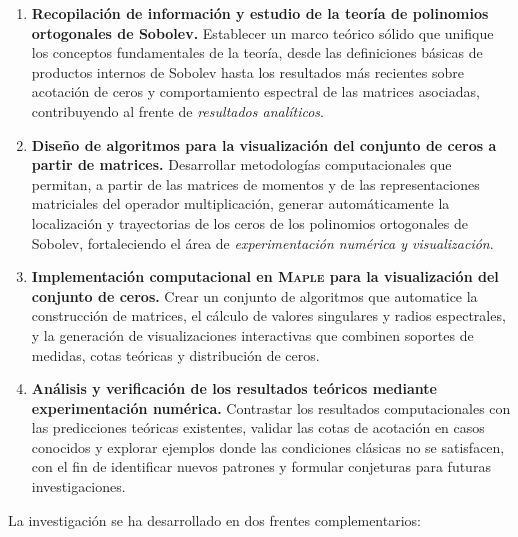 \begin{enumerate}
  \item \textbf{Recopilación de información y estudio de la teoría de polinomios ortogonales de Sobolev.}
        Establecer un marco teórico sólido que unifique los conceptos fundamentales de la teoría, desde las definiciones básicas de productos internos de Sobolev hasta los resultados más recientes sobre acotación de ceros y comportamiento espectral de las matrices asociadas, contribuyendo al frente de \emph{resultados analíticos}.

  \item \textbf{Diseño de algoritmos para la visualización del conjunto de ceros a partir de matrices.}
        Desarrollar metodologías computacionales que permitan, a partir de las matrices de momentos y de las representaciones matriciales del operador multiplicación, generar automáticamente la localización y trayectorias de los ceros de los polinomios ortogonales de Sobolev, fortaleciendo el área de \emph{experimentación numérica y visualización}.

  \item \textbf{Implementación computacional en \textsc{Maple} para la visualización del conjunto de ceros.}
        Crear un conjunto de algoritmos que automatice la construcción de matrices, el cálculo de valores singulares y radios espectrales, y la generación de visualizaciones interactivas que combinen soportes de medidas, cotas teóricas y distribución de ceros.

  \item \textbf{Análisis y verificación de los resultados teóricos mediante experimentación numérica.}
        Contrastar los resultados computacionales con las predicciones teóricas existentes, validar las cotas de acotación en casos conocidos y explorar ejemplos donde las condiciones clásicas no se satisfacen, con el fin de identificar nuevos patrones y formular conjeturas para futuras investigaciones.
\end{enumerate}

La investigación se ha desarrollado en dos frentes complementarios:

